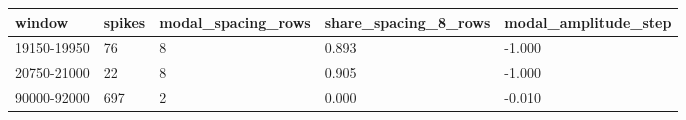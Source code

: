 \begin{tabular}{lllll}
\toprule
window & spikes & modal\_spacing\_rows & share\_spacing\_8\_rows & modal\_amplitude\_step \\
\midrule
19150-19950 & 76 & 8 & 0.893 & -1.000 \\
20750-21000 & 22 & 8 & 0.905 & -1.000 \\
90000-92000 & 697 & 2 & 0.000 & -0.010 \\
\bottomrule
\end{tabular}
